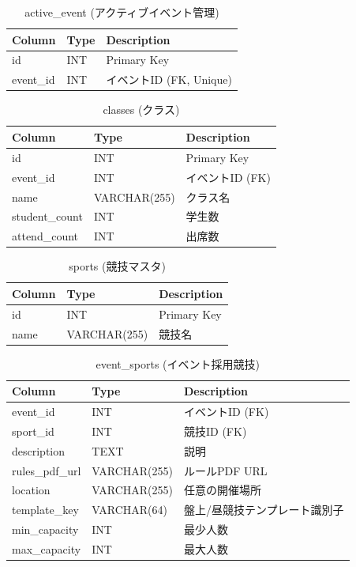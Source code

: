\documentclass[paper=a4, fontsize=11pt]{jlreq}
\begin{document}
\begin{table}[H]
    \centering
    \caption{active\_event (アクティブイベント管理)}
    \begin{tabularx}{\textwidth}{|l|l|X|}
        \toprule
        Column & Type & Description \\
        \midrule
        id & INT & Primary Key \\
        event\_id & INT & イベントID (FK, Unique) \\
        \bottomrule
    \end{tabularx}
\end{table}

\begin{table}[H]
    \centering
    \caption{classes (クラス)}
    \begin{tabularx}{\textwidth}{|l|l|X|}
        \toprule
        Column & Type & Description \\
        \midrule
        id & INT & Primary Key \\
        event\_id & INT & イベントID (FK) \\
        name & VARCHAR(255) & クラス名 \\
        student\_count & INT & 学生数 \\
        attend\_count & INT & 出席数 \\
        \bottomrule
    \end{tabularx}
\end{table}

\begin{table}[H]
    \centering
    \caption{sports (競技マスタ)}
    \begin{tabularx}{\textwidth}{|l|l|X|}
        \toprule
        Column & Type & Description \\
        \midrule
        id & INT & Primary Key \\
        name & VARCHAR(255) & 競技名 \\
        \bottomrule
    \end{tabularx}
\end{table}

\begin{table}[H]
    \centering
    \caption{event\_sports (イベント採用競技)}
    \begin{tabularx}{\textwidth}{|l|l|X|}
        \toprule
        Column & Type & Description \\
        \midrule
        event\_id & INT & イベントID (FK) \\
        sport\_id & INT & 競技ID (FK) \\
        description & TEXT & 説明 \\
        rules\_pdf\_url & VARCHAR(255) & ルールPDF URL \\
        location & VARCHAR(255) & 任意の開催場所 \\
        template\_key & VARCHAR(64) & 盤上/昼競技テンプレート識別子 \\
        min\_capacity & INT & 最少人数 \\
        max\_capacity & INT & 最大人数 \\
        \bottomrule
    \end{tabularx}
\end{table}
\end{document}
